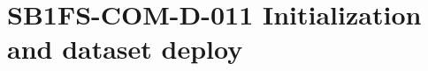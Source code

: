 \renewcommand{\reqid}{N/A}
\renewcommand{\procid}{SB1FS-COM-D-011}
\renewcommand{\procname}{Initialization and dataset deploy}


\section{\procid{} \procname{}} \label{sec:SB1FS-COM-D-011}

